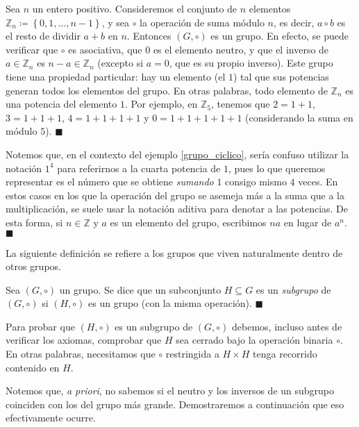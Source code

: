 \begin{example} \label{grupo_ciclico}
Sea $n$ un entero positivo. Consideremos el conjunto de $n$ elementos $\mathbb{Z}_n \coloneq \left\{ 0, 1, \dots, n-1 \right\}$, y sea $\circ$ la operación de suma módulo $n$, es decir, $a \circ b$ es el resto de dividir $a+b$ en $n$. Entonces $(G, \circ)$ es un grupo. En efecto, se puede verificar que $\circ$ es asociativa, que $0$ es el elemento neutro, y que el inverso de $a \in \mathbb{Z}_n$ es $n-a \in \mathbb{Z}_n$ (excepto si $a = 0$, que es su propio inverso).
Este grupo tiene una propiedad particular: hay un elemento (el $1$) tal que sus potencias generan todos los elementos del grupo. En otras palabras, todo elemento de $\mathbb{Z}_n$ es una potencia del elemento $1$. Por ejemplo, en $\mathbb{Z}_5$, tenemos que $2 = 1 + 1$, $3 = 1 + 1 + 1$, $4 = 1 + 1 + 1 + 1$ y $0 = 1 + 1 + 1 + 1 + 1$ (considerando la suma en módulo $5$).
\hfill$\blacksquare$
\end{example}

\begin{remark} Notemos que, en el contexto del ejemplo \ref{grupo_ciclico}, sería confuso utilizar la notación $1^4$ para referirnos a la cuarta potencia de $1$, pues lo que queremos representar es el número que se obtiene \textit{sumando} $1$ consigo mismo $4$ veces. En estos casos en los que la operación del grupo se asemeja más a la suma que a la multiplicación, se suele usar la notación aditiva para denotar a las potencias. De esta forma, si $n \in \mathbb{Z}$ y $a$ es un elemento del grupo, escribimos $n a$ en lugar de $a^n$. \hfill$\blacksquare$
\end{remark}


La siguiente definición se refiere a los grupos que viven naturalmente dentro de otros grupos.

\begin{definition}
Sea $(G,\circ)$ un grupo. Se dice que un subconjunto $H \subseteq G$ es un \emph{subgrupo} de $(G,\circ)$ si $(H, \circ)$ es un grupo (con la misma operación). \hfill$\blacksquare$
\end{definition}

Para probar que $(H, \circ)$ es un subgrupo de $(G, \circ)$ debemos, incluso antes de verificar los axiomas, comprobar que $H$ sea cerrado bajo la operación binaria $\circ$. En otras palabras, necesitamos que $\circ$ restringida a $H \times H$ tenga recorrido contenido en $H$. 


Notemos que, \textit{a priori}, no sabemos si el neutro y los inversos de un subgrupo coinciden con los del grupo más grande. Demostraremos a continuación que eso efectivamente ocurre.


